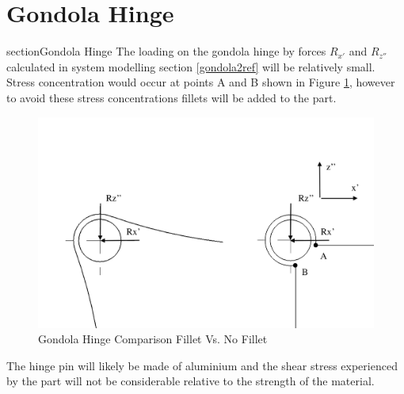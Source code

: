 \documentclass[../main.tex]{subfiles}
\begin{document}
\section{Gondola Hinge} \label{appendix:gondolaHinge}

section{Gondola Hinge}
The loading on the gondola hinge by forces $R_{x'}$ and $R_{z''}$ calculated in system modelling section \ref{gondola2ref} will be relatively small. Stress concentration would occur at points A and B shown in Figure \ref{fig:fillethinge}, however to avoid these stress concentrations fillets will be added to the part. 

\begin{figure}[H]
	\centering
	\includegraphics[width=1\textwidth]{img/gondola/filletHinge.PNG}
	\caption{Gondola Hinge Comparison Fillet Vs. No Fillet}
	\label{fig:fillethinge}
\end{figure}

The hinge pin will likely be made of aluminium and the shear stress experienced by the part will not be considerable relative to the strength of the material. 
\end{document}
